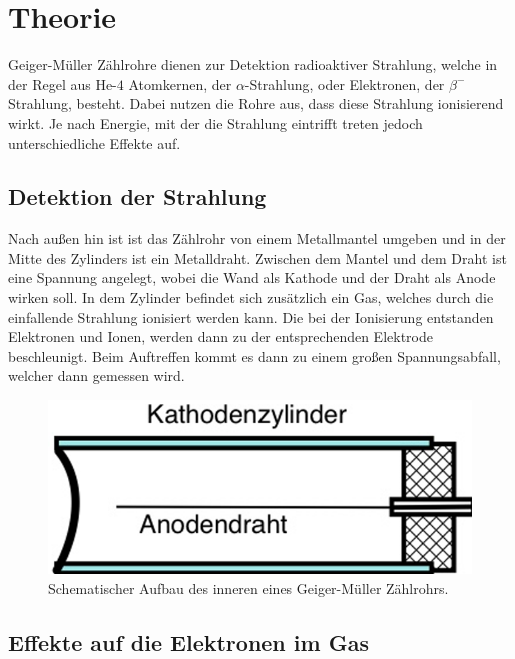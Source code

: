 \section{Theorie}
\label{sec:Theorie}

\noindent Geiger-Müller Zählrohre dienen zur Detektion radioaktiver Strahlung, welche in der Regel aus $\text{He-}4$ Atomkernen,
der $\alpha$-Strahlung, oder Elektronen, der $\beta^-$ Strahlung, besteht. Dabei nutzen die Rohre aus, dass diese 
Strahlung ionisierend wirkt. Je nach Energie, mit der die Strahlung eintrifft treten jedoch unterschiedliche Effekte auf.

\subsection{Detektion der Strahlung}

\noindent Nach außen hin ist ist das Zählrohr von einem Metallmantel umgeben und in der Mitte des Zylinders ist ein Metalldraht.
Zwischen dem Mantel und dem Draht ist eine Spannung angelegt, wobei die Wand als Kathode und der Draht als Anode
wirken soll. In dem Zylinder befindet sich zusätzlich ein Gas, welches durch die einfallende Strahlung ionisiert
werden kann. Die bei der Ionisierung entstanden Elektronen und Ionen, werden dann zu der entsprechenden Elektrode
beschleunigt. Beim Auftreffen kommt es dann zu einem großen Spannungsabfall, welcher dann gemessen wird.

\begin{figure}
    \includegraphics{Bilder/zaelrohr.png}
    \caption{Schematischer Aufbau des inneren eines Geiger-Müller Zählrohrs.}
    \label{fig:geiger}
\end{figure}

\subsection{Effekte auf die Elektronen im Gas}

